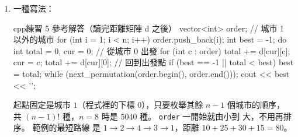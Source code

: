 \begin{enumerate}
\texttt{map} 只能依鍵排序，所以把內容搬進 \texttt{vector}。
\texttt{vector<pair<int, int>> v(cnt.begin(), cnt.end())} 用第~\ref{sec:iterators}~節
「用一個範圍建立容器」的寫法，\texttt{map} 的元素是
\texttt{pair<const int, int>}，複製時會轉成 \texttt{pair<int, int>}。 比
較函式先比次數（由大到小，用 \texttt{>}），相同再比數字（用 \texttt{<}），
兩邊都是嚴格的比較。 參數型別很長時，C++14 起 lambda 的參數可以寫成
\texttt{const auto \&a}，叫泛型 lambda，由編譯器推斷型別。
\item 一種寫法：
\begin{code}{cpp}{練習 5 參考解答（讀完距離矩陣 d 之後）}
vector<int> order;              // 城市 1 以外的城市
for (int i = 1; i < n; i++) {
    order.push_back(i);
}
int best = -1;
do {
    int total = 0, cur = 0;         // 從城市 0 出發
    for (int c : order) {
        total += d[cur][c];
        cur = c;
    }
    total += d[cur][0];             // 回到出發點
    if (best == -1 || total < best) {
        best = total;
    }
} while (next_permutation(order.begin(), order.end()));
cout << best << '\n';
\end{code}
起點固定是城市 $1$（程式裡的下標 $0$），只要枚舉其餘 $n - 1$ 個城市的順序，
共 $(n - 1)!$ 種，$n = 8$ 時是 $5040$ 種。 \texttt{order} 一開始就由小到
大，不用再排序。 範例的最短路線
是 $1 \to 2 \to 4 \to 3 \to 1$，距離 $10 + 25 + 30 + 15 = 80$。
\end{enumerate}
